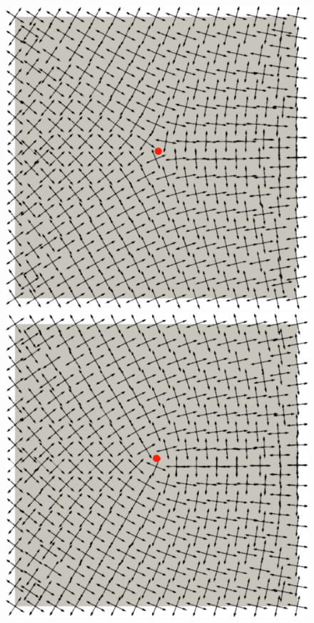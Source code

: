 \begin{figure}[!h]
  \centering
  \includegraphics[scale=0.25]{images/index_-025.pdf}
  \includegraphics[scale=0.25]{images/index_025.pdf}

\end{figure}
